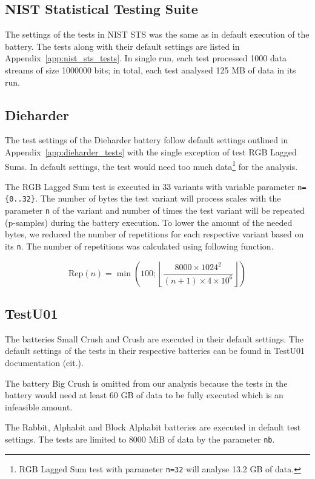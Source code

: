 \documentclass[
  digital,  	%
  color,		%
  oneside,   	%
  12pt,
  nocover,
  notable,
  nolof,
  nolot,
]{fithesis3}
\theoremstyle{definition}
\theoremstyle{remark}
\begin{document}
\subsection*{NIST Statistical Testing Suite}
The settings of the tests in NIST STS was the same as in default execution of the battery. The tests along with their default settings are listed in Appendix~\ref{app:nist_sts_tests}. In single run, each test processed 1000 data streams of size 1000000 bits; in total, each test analysed 125 MB of data in its run.

\subsection*{Dieharder}
The test settings of the Dieharder battery follow default settings outlined in Appendix~\ref{app:dieharder_tests} with the single exception of test RGB Lagged Sums. In default settings, the test would need too much data\footnote{RGB Lagged Sum test with parameter \texttt{n=32} will analyse 13.2 GB of data.} for the analysis. 

The RGB Lagged Sum test is executed in 33 variants with variable parameter \texttt{n=\{0..32\}}. The number of bytes the test variant will process scales with the parameter \texttt{n} of the variant and number of times the test variant will be repeated (p-samples) during the battery execution. To lower the amount of the needed bytes, we reduced the number of repetitions for each respective variant based on its \texttt{n}. The number of repetitions was calculated using following function.

$$
\text{Rep}(n) = \min\left(100 ; \left\lfloor \frac{ 8000 \times 1024^{2} }{ (n + 1) \times 4 \times 10^{6} } \right\rfloor \right)
$$

\subsection*{TestU01}
The batteries Small Crush and Crush are executed in their default settings. The default settings of the tests in their respective batteries can be found in TestU01 documentation (cit.).

The battery Big Crush is omitted from our analysis because the tests in the battery would need at least 60 GB of data to be fully executed which is an infeasible amount.

The Rabbit, Alphabit and Block Alphabit batteries are executed in default test settings. The tests are limited to 8000 MiB of data by the parameter \texttt{nb}.
\end{document}
